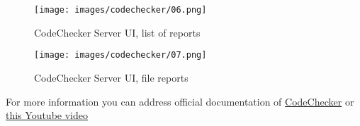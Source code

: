 \begin{figure}[H]
    \centering
        \caption{CodeChecker Server UI, list of reports}
    \texttt{[image: images/codechecker/06.png]}
    \label{fig:codechecker-html-server}
\end{figure}


\begin{figure}[H]
    \centering
        \caption{CodeChecker Server UI, file reports}
    \texttt{[image: images/codechecker/07.png]}
    \label{fig:codechecker-html-server}
\end{figure}


For more information you can address official documentation of \href{https://codechecker.readthedocs.io/en/latest/}{CodeChecker} or \href{https://www.youtube.com/watch?v=sQ2Qj0kHoRY&t=2487s}{this Youtube video} 